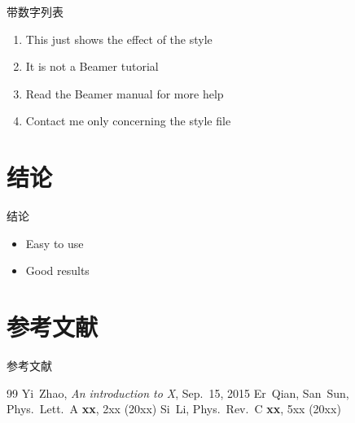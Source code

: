 \documentclass[10pt,aspectratio=169,usepdftitle=false]{beamer}
\begin{document}
\begin{frame}{带数字列表}
  \begin{enumerate}
    \item This just shows the effect of the style
    \item It is not a Beamer tutorial
    \item Read the Beamer manual for more help
    \item Contact me only concerning the style file
  \end{enumerate}
\end{frame}

\section{结论}
\begin{frame}{结论}
  \begin{itemize}
    \item Easy to use
    \item Good results
  \end{itemize}
\end{frame}

\section{参考文献}
\begin{frame}{参考文献}
  \begin{thebibliography}{99}
     Yi~Zhao, \textsl{An introduction to X}, Sep.~15, 2015
     Er~Qian, San~Sun,
      Phys.\ Lett.\ A \textbf{xx}, 2xx (20xx)
     Si~Li, Phys.\ Rev.\ C \textbf{xx}, 5xx (20xx)
  \end{thebibliography}
\end{frame}
\end{document}
